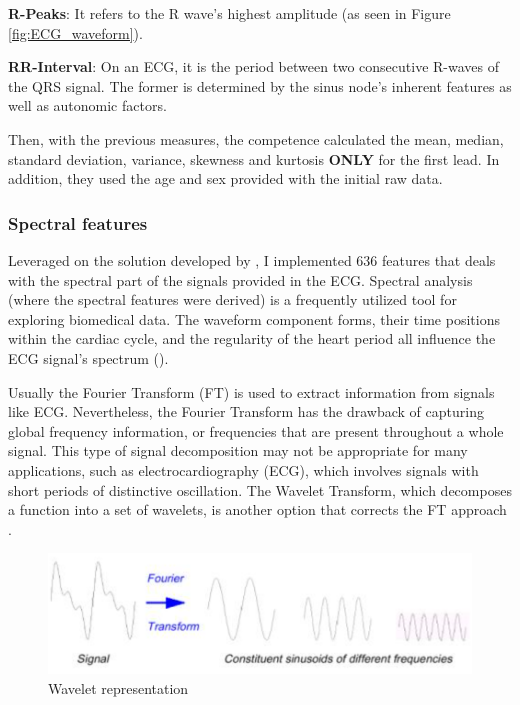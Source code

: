 \textbf{R-Peaks}: It refers to the R wave's highest amplitude (as seen in Figure \ref{fig:ECG_waveform}).

\textbf{RR-Interval}: On an ECG, it is the period between two consecutive R-waves of the QRS signal. The former is determined by the sinus node's inherent features as well as autonomic factors.

Then, with the previous measures, the competence calculated the mean, median, standard deviation, variance, skewness and kurtosis \textbf{ONLY} for the first lead. In addition, they used the age and sex provided with the initial raw data.

\subsubsection{Spectral features}

Leveraged on the solution developed by \cite{github_spectralfeatures}, I implemented 636 features that deals with the spectral part of the signals provided in the ECG. Spectral analysis (where the spectral features were derived) is a frequently utilized tool for exploring biomedical data. The waveform component forms, their time positions within the cardiac cycle, and the regularity of the heart period all influence the ECG signal's spectrum (\cite{spectralfeatures}). 

Usually the Fourier Transform (FT) is used to extract information from signals like ECG. Nevertheless, the Fourier Transform has the drawback of capturing global frequency information, or frequencies that are present throughout a whole signal. This type of signal decomposition may not be appropriate for many applications, such as electrocardiography (ECG), which involves signals with short periods of distinctive oscillation. The Wavelet Transform, which decomposes a function into a set of wavelets, is another option that corrects the FT approach \cite{spectral_features}.

\begin{figure}[H]
\centering
\includegraphics[scale=0.4]{img/wavelet.PNG}
\caption{Wavelet representation}
\label{fig:wavelet}
\end{figure}

